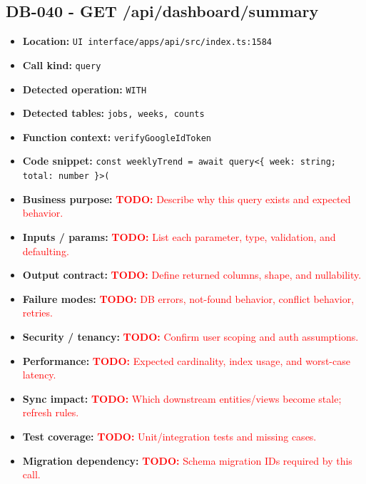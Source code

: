 \documentclass[11pt]{article}
\newcommand{\todoitem}[1]{\textcolor{red}{\textbf{TODO:} #1}}
\begin{document}
\subsection{DB-040 - GET /api/dashboard/summary}
\begin{itemize}[leftmargin=1.5em]
\item \textbf{Location:} \texttt{UI interface/apps/api/src/index.ts:1584}
\item \textbf{Call kind:} \texttt{query}
\item \textbf{Detected operation:} \texttt{WITH}
\item \textbf{Detected tables:} \texttt{jobs, weeks, counts}
\item \textbf{Function context:} \texttt{verifyGoogleIdToken}
\item \textbf{Code snippet:} \texttt{const weeklyTrend = await query<\{ week: string; total: number \}>(}
\item \textbf{Business purpose:} \todoitem{Describe why this query exists and expected behavior.}
\item \textbf{Inputs / params:} \todoitem{List each parameter, type, validation, and defaulting.}
\item \textbf{Output contract:} \todoitem{Define returned columns, shape, and nullability.}
\item \textbf{Failure modes:} \todoitem{DB errors, not-found behavior, conflict behavior, retries.}
\item \textbf{Security / tenancy:} \todoitem{Confirm user scoping and auth assumptions.}
\item \textbf{Performance:} \todoitem{Expected cardinality, index usage, and worst-case latency.}
\item \textbf{Sync impact:} \todoitem{Which downstream entities/views become stale; refresh rules.}
\item \textbf{Test coverage:} \todoitem{Unit/integration tests and missing cases.}
\item \textbf{Migration dependency:} \todoitem{Schema migration IDs required by this call.}
\end{itemize}
\end{document}
